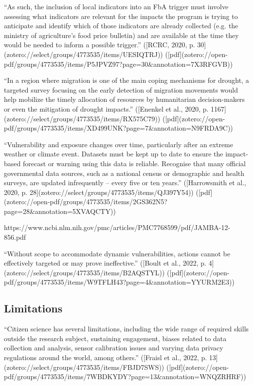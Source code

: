“As such, the inclusion of local indicators into an FbA trigger must involve assessing what indicators are relevant for the impacts the program is trying to anticipate and identify which of those indicators are already collected (e.g. the ministry of agriculture's food price bulletin) and are available at the time they would be needed to inform a possible trigger.” ([RCRC, 2020, p. 30](zotero://select/groups/4773535/items/UESIQTRJ)) ([pdf](zotero://open-pdf/groups/4773535/items/P5JPVZ97?page=30&annotation=7X3RFGVB))


“In a region where migration is one of the main coping mechanisms for drought, a targeted survey focusing on the early detection of migration movements would help mobilize the timely allocation of resources by humanitarian decision-makers or even the mitigation of drought impacts.” ([Enenkel et al., 2020, p. 1167](zotero://select/groups/4773535/items/RX575C79)) ([pdf](zotero://open-pdf/groups/4773535/items/XD499UNK?page=7&annotation=N9FRDA9C))



“Vulnerability and exposure changes over time, particularly after an extreme weather or climate event. Datasets must be kept up to date to ensure the impact-based forecast or warning using this data is reliable. Recognise that many official governmental data sources, such as a national census or demographic and health surveys, are updated infrequently – every five or ten years.” ([Harrowsmith et al., 2020, p. 28](zotero://select/groups/4773535/items/QJ397Y54)) ([pdf](zotero://open-pdf/groups/4773535/items/2GS362N5?page=28&annotation=5XVAQCTY))





https://www.ncbi.nlm.nih.gov/pmc/articles/PMC7768599/pdf/JAMBA-12-856.pdf

“Without scope to accommodate dynamic vulnerabilities, actions cannot be effectively targeted or may prove ineffective.” ([Boult et al., 2022, p. 4](zotero://select/groups/4773535/items/B2AQSTYL)) ([pdf](zotero://open-pdf/groups/4773535/items/W9TFLH43?page=4&annotation=YYURM2E3))




\subsection{Limitations}
“Citizen science has several limitations, including the wide range of required skills outside the research subject, sustaining engagement, biases related to data collection and analysis, sensor calibration issues and varying data privacy regulations around the world, among others.” ([Fraisl et al., 2022, p. 13](zotero://select/groups/4773535/items/FBJD7SWS)) ([pdf](zotero://open-pdf/groups/4773535/items/7WBDKYDY?page=13&annotation=WNQZRHRF))
